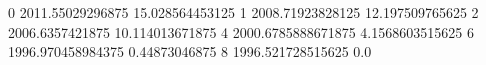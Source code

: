 0 2011.55029296875 15.028564453125
1 2008.71923828125 12.197509765625
2 2006.6357421875 10.114013671875
4 2000.6785888671875 4.1568603515625
6 1996.970458984375 0.44873046875
8 1996.521728515625 0.0

